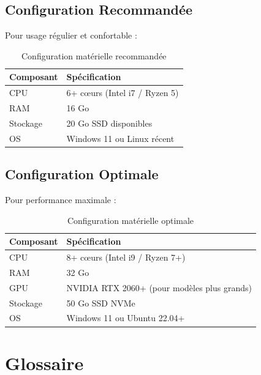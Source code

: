 \documentclass[12pt,a4paper]{report}
\begin{document}
\section{Configuration Recommandée}

Pour usage régulier et confortable :

\begin{table}[H]
    \centering
    \renewcommand{\arraystretch}{1.3}
    \begin{tabular}{|l|l|}
        \hline
        \rowcolor{green!20}
        \textbf{Composant} & \textbf{Spécification} \\
        \hline
        CPU & 6+ cœurs (Intel i7 / Ryzen 5) \\
        \hline
        RAM & 16 Go \\
        \hline
        Stockage & 20 Go SSD disponibles \\
        \hline
        OS & Windows 11 ou Linux récent \\
        \hline
    \end{tabular}
    \caption{Configuration matérielle recommandée}
\end{table}

\section{Configuration Optimale}

Pour performance maximale :

\begin{table}[H]
    \centering
    \renewcommand{\arraystretch}{1.3}
    \begin{tabular}{|l|l|}
        \hline
        \rowcolor{green!20}
        \textbf{Composant} & \textbf{Spécification} \\
        \hline
        CPU & 8+ cœurs (Intel i9 / Ryzen 7+) \\
        \hline
        RAM & 32 Go \\
        \hline
        GPU & NVIDIA RTX 2060+ (pour modèles plus grands) \\
        \hline
        Stockage & 50 Go SSD NVMe \\
        \hline
        OS & Windows 11 ou Ubuntu 22.04+ \\
        \hline
    \end{tabular}
    \caption{Configuration matérielle optimale}
\end{table}

\chapter{Glossaire}
\end{document}
